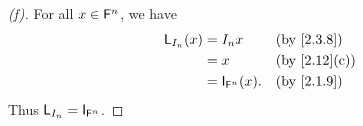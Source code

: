 \begin{proof}[(f)]
  For all \(x \in \mathsf{F}^n\), we have
  \begin{align*}
    \L_{I_n}(x) & = I_n x              &  & \text{(by \cref{2.3.8})}   \\
                & = x                  &  & \text{(by \cref{2.12}(c))} \\
                & = \IT_{\vs{F}^n}(x). &  & \text{(by \cref{2.1.9})}
  \end{align*}
  Thus \(\L_{I_n} = \IT_{\vs{F}^n}\).
\end{proof}

\begin{thm}\label{2.16}

\end{thm}

\exercisesection

\begin{ex}\label{ex:2.3.14}

\end{ex}
